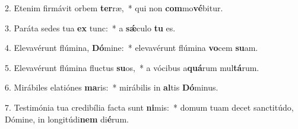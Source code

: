 2. Etenim firmávit orbem \textbf{ter}ræ,~*  qui non \textbf{com}mo\textbf{vé}bitur.\

3. Paráta sedes tua \textbf{ex} tunc:~*  a \textbf{sǽ}culo \textbf{tu} es.\

4. Elevavérunt flúmina, \textbf{Dó}mine:~*  elevavérunt flúmina \textbf{vo}cem \textbf{su}am.\

5. Elevavérunt flúmina fluctus \textbf{su}os,~*  a vócibus a\textbf{quá}rum mul\textbf{tá}rum.\

6. Mirábiles elatiónes \textbf{ma}ris:~*  mirábilis in \textbf{al}tis \textbf{Dó}minus.\

7. Testimónia tua credibília facta sunt \textbf{ni}mis:~*  domum tuam decet sanctitúdo, Dómine, in longitúdi\textbf{nem} di\textbf{é}rum.\

